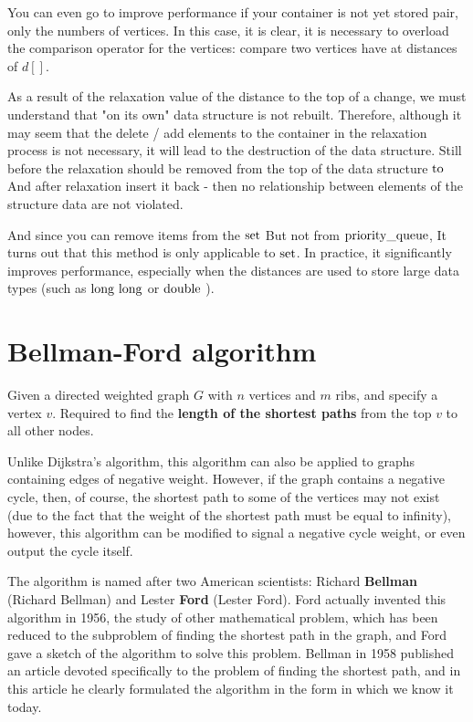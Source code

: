 You can even go to improve performance if your container is not yet stored pair, only the numbers of vertices. In this case, it is clear, it is necessary to overload the comparison operator for the vertices: compare two vertices have at distances of $d []$.

As a result of the relaxation value of the distance to the top of a change, we must understand that "on its own" data structure is not rebuilt. Therefore, although it may seem that the delete / add elements to the container in the relaxation process is not necessary, it will lead to the destruction of the data structure. Still before the relaxation should be removed from the top of the data structure $\rm to$ And after relaxation insert it back - then no relationship between elements of the structure data are not violated.

And since you can remove items from the $\rm set$ But not from $\rm priority \_queue$, It turns out that this method is only applicable to $\rm set$. In practice, it significantly improves performance, especially when the distances are used to store large data types (such as $\rm long\ long$ or $\rm double$ ).

\section{ Bellman-Ford algorithm }
Given a directed weighted graph $G$ with $n$ vertices and $m$ ribs, and specify a vertex $v$. Required to find the \textbf{length of the shortest paths} from the top $v$ to all other nodes.

Unlike Dijkstra's algorithm, this algorithm can also be applied to graphs containing edges of negative weight. However, if the graph contains a negative cycle, then, of course, the shortest path to some of the vertices may not exist (due to the fact that the weight of the shortest path must be equal to infinity), however, this algorithm can be modified to signal a negative cycle weight, or even output the cycle itself.

The algorithm is named after two American scientists: Richard \textbf{Bellman} (Richard Bellman) and Lester \textbf{Ford} (Lester Ford). Ford actually invented this algorithm in 1956, the study of other mathematical problem, which has been reduced to the subproblem of finding the shortest path in the graph, and Ford gave a sketch of the algorithm to solve this problem. Bellman in 1958 published an article devoted specifically to the problem of finding the shortest path, and in this article he clearly formulated the algorithm in the form in which we know it today.

